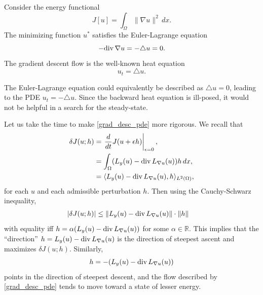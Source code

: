 \begin{example}
Consider the energy functional 
\[ J[u] = \int_{\Omega} \|\nabla u\|^2 \, dx.\]
The minimizing function $u^*$ satisfies the Euler-Lagrange equation
\[-{\rm div}\, \nabla u	= - \triangle u = 0.\]
The gradient descent flow is the well-known heat equation
\[u_t = \triangle u.\]
\end{example}

The Euler-Lagrange equation could equivalently be described as $\triangle u = 0$, leading to the PDE $u_t = -\triangle u$. 
Since the backward heat equation is ill-posed, it would not be helpful in a search for the steady-state. 

Let us take the time to make \eqref{grad_desc_pde} more rigorous. 
We recall that 
\begin{align*}
		\delta J(u;h) &= \left.\frac{d}{dt}J(u + \epsilon h)\right|_{\epsilon=0},\\
		&= \int_{\Omega} (L_y(u) - {\rm div}\, L_{\nabla u}(u)) h\, dx,\\
		&= \langle L_y(u) - {\rm div}\, L_{\nabla u}(u), h \rangle_{L^2(\Omega)},
\end{align*}
for each $u$ and each admissible perturbation $h$.
Then using the Cauchy-Schwarz inequality,
\begin{align*}
	|\delta J(u;h)| &\leq \|L_y(u) - {\rm div}\, L_{\nabla u}(u)\| \cdot \| h \|
\end{align*}
with equality iff $h =\alpha(L_y(u) - {\rm div}\, L_{\nabla u}(u))$ for some $\alpha \in \mathbb{R}$. 
This implies that the ``direction''
$h = L_y(u) - {\rm div}\, L_{\nabla u}(u)$ is the direction of steepest ascent and 
maximizes $\delta J(u;h)$. 
Similarly,
\[h = -(L_y(u) - {\rm div}\, L_{\nabla u}(u))\]
 points in the direction of steepest descent, and the flow described by \eqref{grad_desc_pde} tends to move toward a state of lesser energy. 


